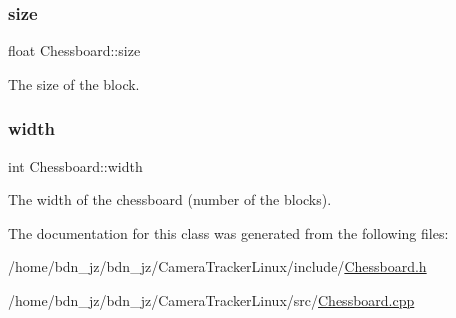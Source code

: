 \subsubsection{\texorpdfstring{size}{size}}
{\footnotesize\ttfamily float Chessboard\+::size\hspace{0.3cm}{\ttfamily [private]}}

The size of the block. \mbox{\label{class_chessboard_a508e83c453e3aef8af69bdb934262d83}} 
\subsubsection{\texorpdfstring{width}{width}}
{\footnotesize\ttfamily int Chessboard\+::width\hspace{0.3cm}{\ttfamily [private]}}

The width of the chessboard (number of the blocks). 

The documentation for this class was generated from the following files\+:\begin{DoxyCompactItemize}
\item 
/home/bdn\+\_\+jz/bdn\+\_\+jz/\+Camera\+Tracker\+Linux/include/\hyperlink{_chessboard_8h}{Chessboard.\+h}\item 
/home/bdn\+\_\+jz/bdn\+\_\+jz/\+Camera\+Tracker\+Linux/src/\hyperlink{_chessboard_8cpp}{Chessboard.\+cpp}\end{DoxyCompactItemize}
